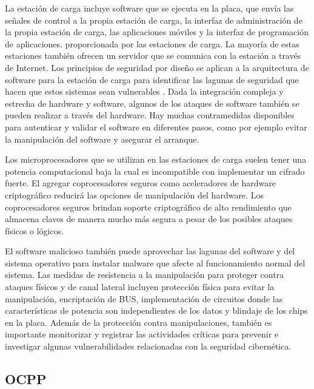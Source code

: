 \documentclass[12pt,a4paper,onecolumn,oneside]{report}
\newcounter{subsubsubsection}[subsubsection]
\begin{document}

La estación de carga incluye software que se ejecuta en la placa, que envía las señales de control a la propia estación de carga, la interfaz de administración de la propia estación de carga, las aplicaciones móviles y la interfaz de programación de aplicaciones. proporcionada por las estaciones de carga. La mayoría de estas estaciones también ofrecen un servidor que se comunica con la estación a través de Internet. Los principios de seguridad por diseño se aplican a la arquitectura de software para la estación de carga para identificar las lagunas de seguridad que hacen que estos sistemas sean vulnerables \cite{catorce}. Dada la integración compleja y estrecha de hardware y software, algunos de los ataques de software también se pueden realizar a través del hardware. Hay muchas contramedidas disponibles para autenticar y validar el software en diferentes pasos, como por ejemplo evitar la manipulación del software y asegurar el arranque.


Los microprocesadores que se utilizan en las estaciones de carga suelen tener una potencia computacional baja la cual es incompatible con implementar un cifrado fuerte. El agregar coprocesadores seguros como aceleradores de hardware criptográfico \cite{quince} reducirá las opciones de manipulación del hardware. Los coprocesadores seguros brindan soporte criptográfico de alto rendimiento que almacena claves de manera mucho más segura a pesar de los posibles ataques físicos o lógicos.



El software malicioso también puede aprovechar las lagunas del software y del sistema operativo para instalar malware que afecte al funcionamiento normal del sistema. Las medidas de resistencia a la manipulación para proteger contra ataques físicos y de canal lateral incluyen protección física para evitar la manipulación, encriptación de BUS, implementación de circuitos donde las características de potencia son independientes de los datos y blindaje de los chips en la placa. Además de la protección contra manipulaciones, también es importante monitorizar y registrar las actividades críticas para prevenir e investigar algunas vulnerabilidades relacionadas con la seguridad cibernética.



\subsection{OCPP}
\label{OCPP}
\end{document}
